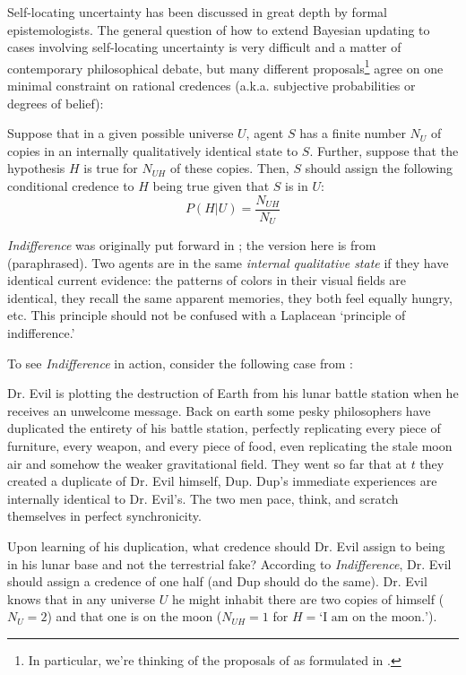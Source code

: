 \documentclass[onecolumn,secnumarabic,amsmath,amssymb,balancelastpage,nofootinbib]{article}
\begin{document}
Self-locating uncertainty has been discussed in great depth by formal epistemologists.  The general question of how to extend Bayesian updating to cases involving self-locating uncertainty is very difficult and a matter of contemporary philosophical debate, but many different proposals\footnote{In particular, we're thinking of the proposals of \citep{bostrom2002,meacham2008,ManleyF} as formulated in \citep{ManleyF}.}\label{listofproposals} agree on one minimal constraint on rational credences (a.k.a. subjective probabilities or degrees of belief):
\begin{description}[font=\normalfont\bfseries]
\item[Indifference] Suppose that in a given possible universe $U$, agent $S$ has a finite number $N_U$ of copies in an internally qualitatively identical state to $S$.  Further, suppose that the hypothesis $H$ is true for $N_{UH}$ of these copies.  Then, $S$ should assign the following conditional credence to $H$ being true given that $S$ is in $U$:
\begin{equation}
P(H|U)=\frac{N_{UH}}{N_U}
\label{}
\end{equation}
\end{description}
\emph{Indifference} was originally put forward in \citep{elga2004}; the version here is from \citep{ManleyF} (paraphrased).  Two agents are in the same \emph{internal qualitative state} if they have identical current evidence: the patterns of colors in their visual fields are identical, they recall the same apparent memories, they both feel equally hungry, etc.  This principle should not be confused with a Laplacean `principle of indifference.'

To see \emph{Indifference} in action, consider the following case from \citet{elga2004}:
\begin{description}[font=\normalfont\scshape]
\item[Duplicating Dr. Evil]  Dr. Evil is plotting the destruction of Earth from his lunar battle station when he receives an unwelcome message.  Back on earth some pesky philosophers have duplicated the entirety of his battle station, perfectly replicating every piece of furniture, every weapon, and every piece of food, even replicating the stale moon air and somehow the weaker gravitational field.  They went so far that at $t$ they created a duplicate of Dr. Evil himself, Dup.  Dup's immediate experiences are internally identical to Dr. Evil's.  The two men pace, think, and scratch themselves in perfect synchronicity.
\end{description}
Upon learning of his duplication, what credence should Dr. Evil assign to being in his lunar base and not the terrestrial fake?  According to \textit{Indifference}, Dr. Evil should assign a credence of one half (and Dup should do the same).  Dr. Evil knows that in any universe $U$ he might inhabit there are two copies of himself ($N_U=2$) and that one is on the moon ($N_{UH}=1$ for $H=\text{`I am on the moon.'}$).
\end{document}

